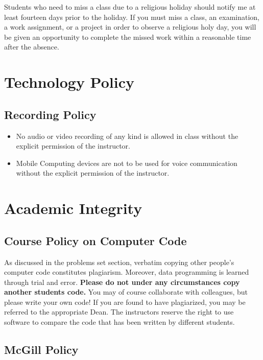 \documentclass[11pt,]{article}
\providecommand{\tightlist}{%
  \setlength{\itemsep}{0pt}\setlength{\parskip}{0pt}}
\begin{document}
Students who need to miss a class due to a religious holiday should
notify me at least fourteen days prior to the holiday. If you must miss
a class, an examination, a work assignment, or a project in order to
observe a religious holy day, you will be given an opportunity to
complete the missed work within a reasonable time after the absence.

\section{Technology Policy}\label{technology-policy}

\subsection{Recording Policy}\label{recording-policy}

\begin{itemize}
\tightlist
\item
  No audio or video recording of any kind is allowed in class without
  the explicit permission of the instructor.
\item
  Mobile Computing devices are not to be used for voice communication
  without the explicit permission of the instructor.
\end{itemize}

\section{Academic Integrity}\label{academic-integrity}

\subsection{Course Policy on Computer
Code}\label{course-policy-on-computer-code}

As discussed in the problems set section, verbatim copying other
people's computer code constitutes plagiarism. Moreover, data
programming is learned through trial and error. \textbf{Please do not
under any circumstances copy another students code.} You may of course
collaborate with colleagues, but please write your own code! If you are
found to have plagiarized, you may be referred to the appropriate Dean.
The instructors reserve the right to use software to compare the code
that has been written by different students.

\subsection{McGill Policy}\label{mcgill-policy}
\end{document}
